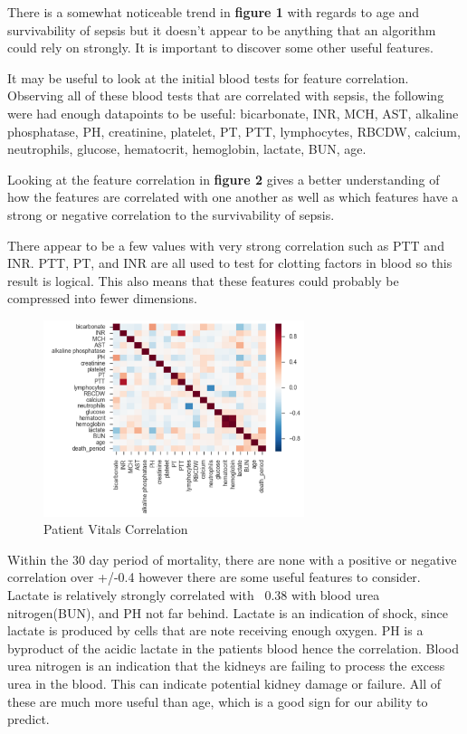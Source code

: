 \documentclass[11pt]{article}
\begin{document}
	There is a somewhat noticeable trend in \textbf{figure 1} with regards to age and survivability of sepsis but it doesn't appear to be anything that an algorithm could rely on strongly. It is important to discover some other useful features.
	
	It may be useful to look at the initial blood tests for feature correlation. Observing all of these blood tests that are correlated with sepsis, the following were had enough datapoints to be useful: bicarbonate, INR, MCH, AST, alkaline phosphatase, PH, creatinine, platelet, PT, PTT, lymphocytes, RBCDW, calcium, neutrophils, glucose, hematocrit, hemoglobin, lactate, BUN, age.
	
	Looking at the feature correlation in \textbf{figure 2} gives a better understanding of how the features are correlated with one another as well as which features have a strong or negative correlation to the survivability of sepsis.
	
	
	
	
	There appear to be a few values with very strong correlation such as PTT and INR. PTT, PT, and INR are all used to test for clotting factors in blood so this result is logical. This also means that these features could probably be compressed into fewer dimensions.
	
	\begin{figure}
		\begin{center}
			\includegraphics[width=0.68\textwidth]{feature_correlation.png}
		\end{center}
		\caption{Patient Vitals Correlation}
	\end{figure}
	
	Within the 30 day period of mortality, there are none with a positive or negative correlation over +/-0.4 however there are some useful features to consider. Lactate is relatively strongly correlated with ~0.38 with blood urea nitrogen(BUN), and PH not far behind. Lactate is an indication of shock, since lactate is produced by cells that are note receiving enough oxygen. PH is a byproduct of the acidic lactate in the patients blood hence the correlation. Blood urea nitrogen is an indication that the kidneys are failing to process the excess urea in the blood. This can indicate potential kidney damage or failure. All of these are much more useful than age, which is a good sign for our ability to predict.
	
\end{document}
